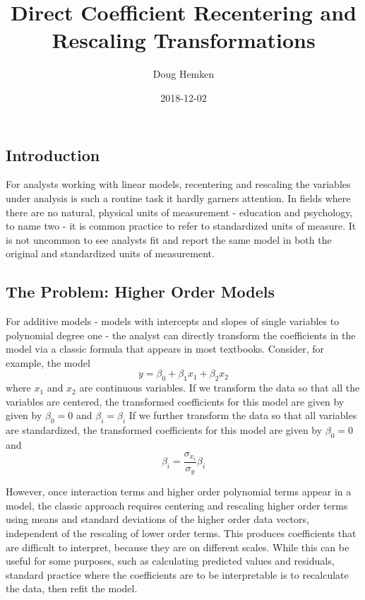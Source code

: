 \documentclass[]{article}
\title{Direct Coefficient Recentering and Rescaling Transformations}
\author{Doug Hemken}
\date{2018-12-02}
\begin{document}
\maketitle

{
\setcounter{tocdepth}{3}
\tableofcontents
}
\subsection{Introduction}\label{introduction}

For analysts working with linear models, recentering and rescaling the
variables under analysis is such a routine task it hardly garners
attention. In fields where there are no natural, physical units of
measurement - education and psychology, to name two - it is common
practice to refer to standardized units of measure. It is not uncommon
to see analysts fit and report the same model in both the original and
standardized units of measurement.

\subsection{The Problem: Higher Order
Models}\label{the-problem-higher-order-models}

For additive models - models with intercepts and slopes of single
variables to polynomial degree one - the analyst can directly transform
the coefficients in the model via a classic formula that appears in most
textbooks. Consider, for example, the model
\[y = \beta_0 + \beta_1x_1 + \beta_2x_2\] where \(x_1\) and \(x_2\) are
continuous variables. If we transform the data so that all the variables
are centered, the transformed coefficients for this model are given by
given by \(\beta_0=0\) and \(\beta_i=\beta_i\) If we further transform
the data so that all variables are standardized, the transformed
coefficients for this model are given by \(\beta_0=0\) and
\[\beta_i=\frac{\sigma_{x_i}}{\sigma_y}\beta_i\]

However, once interaction terms and higher order polynomial terms appear
in a model, the classic approach requires centering and rescaling higher
order terms using means and standard deviations of the higher order data
vectors, independent of the rescaling of lower order terms. This
produces coefficients that are difficult to interpret, because they are
on different scales. While this can be useful for some purposes, such as
calculating predicted values and residuals, standard practice where the
coefficients are to be interpretable is to recalculate the data, then
refit the model.
\end{document}
